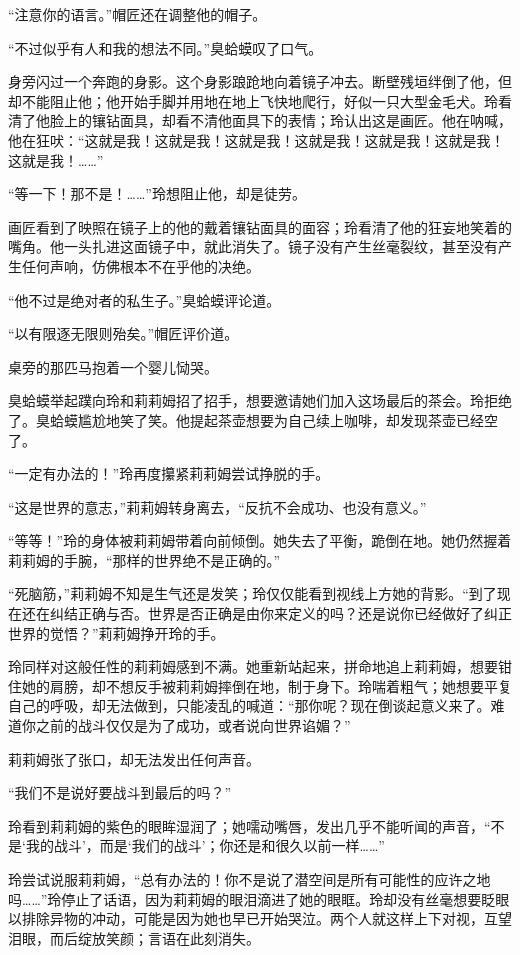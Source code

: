 “注意你的语言。”帽匠还在调整他的帽子。

“不过似乎有人和我的想法不同。”臭蛤蟆叹了口气。

身旁闪过一个奔跑的身影。这个身影踉跄地向着镜子冲去。断壁残垣绊倒了他，但却不能阻止他；他开始手脚并用地在地上飞快地爬行，好似一只大型金毛犬。玲看清了他脸上的镶钻面具，却看不清他面具下的表情；玲认出这是画匠。他在呐喊，他在狂吠：“这就是我！这就是我！这就是我！这就是我！这就是我！这就是我！这就是我！……”

“等一下！那不是！……”玲想阻止他，却是徒劳。

画匠看到了映照在镜子上的他的戴着镶钻面具的面容；玲看清了他的狂妄地笑着的嘴角。他一头扎进这面镜子中，就此消失了。镜子没有产生丝毫裂纹，甚至没有产生任何声响，仿佛根本不在乎他的决绝。

“他不过是绝对者的私生子。”臭蛤蟆评论道。

“以有限逐无限则殆矣。”帽匠评价道。

桌旁的那匹马抱着一个婴儿恸哭。

臭蛤蟆举起蹼向玲和莉莉姆招了招手，想要邀请她们加入这场最后的茶会。玲拒绝了。臭蛤蟆尴尬地笑了笑。他提起茶壶想要为自己续上咖啡，却发现茶壶已经空了。

“一定有办法的！”玲再度攥紧莉莉姆尝试挣脱的手。

“这是世界的意志，”莉莉姆转身离去，“反抗不会成功、也没有意义。”

“等等！”玲的身体被莉莉姆带着向前倾倒。她失去了平衡，跪倒在地。她仍然握着莉莉姆的手腕，“那样的世界绝不是正确的。”

“死脑筋，”莉莉姆不知是生气还是发笑；玲仅仅能看到视线上方她的背影。“到了现在还在纠结正确与否。世界是否正确是由你来定义的吗？还是说你已经做好了纠正世界的觉悟？”莉莉姆挣开玲的手。

玲同样对这般任性的莉莉姆感到不满。她重新站起来，拼命地追上莉莉姆，想要钳住她的肩膀，却不想反手被莉莉姆摔倒在地，制于身下。玲喘着粗气；她想要平复自己的呼吸，却无法做到，只能凌乱的喊道：“那你呢？现在倒谈起意义来了。难道你之前的战斗仅仅是为了成功，或者说向世界谄媚？”

莉莉姆张了张口，却无法发出任何声音。

“我们不是说好要战斗到最后的吗？”

玲看到莉莉姆的紫色的眼眸湿润了；她嚅动嘴唇，发出几乎不能听闻的声音，“不是‘我的战斗’，而是‘我们的战斗’；你还是和很久以前一样……”

玲尝试说服莉莉姆，“总有办法的！你不是说了潜空间是所有可能性的应许之地吗……”玲停止了话语，因为莉莉姆的眼泪滴进了她的眼眶。玲却没有丝毫想要眨眼以排除异物的冲动，可能是因为她也早已开始哭泣。两个人就这样上下对视，互望泪眼，而后绽放笑颜；言语在此刻消失。


